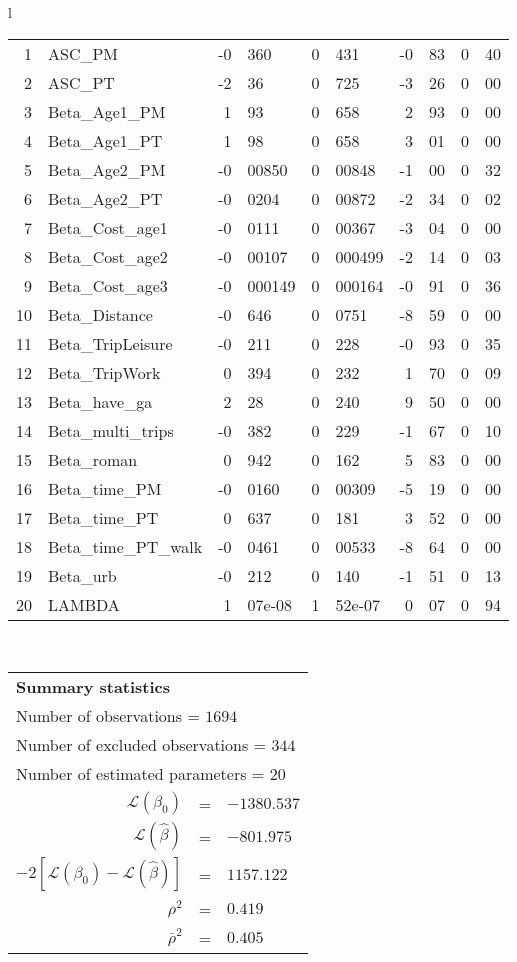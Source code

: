 \begin{tabular}{l}
\begin{tabular}{rlr@{.}lr@{.}lr@{.}lr@{.}l}
1 & ASC_PM  & -0&360 & 0&431 & -0&83 & 0&40\\
2 & ASC_PT & -2&36 & 0&725 & -3&26 & 0&00\\
3 & Beta_Age1_PM & 1&93 & 0&658 & 2&93 & 0&00\\
4 & Beta_Age1_PT & 1&98 & 0&658 & 3&01 & 0&00\\
5 & Beta_Age2_PM & -0&00850 & 0&00848 & -1&00 & 0&32\\
6 & Beta_Age2_PT & -0&0204 & 0&00872 & -2&34 & 0&02\\
7 & Beta_Cost_age1 & -0&0111 & 0&00367 & -3&04 & 0&00\\
8 & Beta_Cost_age2 & -0&00107 & 0&000499 & -2&14 & 0&03\\
9 & Beta_Cost_age3 & -0&000149 & 0&000164 & -0&91 & 0&36\\
10 & Beta_Distance & -0&646 & 0&0751 & -8&59 & 0&00\\
11 & Beta_TripLeisure & -0&211 & 0&228 & -0&93 & 0&35\\
12 & Beta_TripWork & 0&394 & 0&232 & 1&70 & 0&09\\
13 & Beta_have_ga & 2&28 & 0&240 & 9&50 & 0&00\\
14 & Beta_multi_trips & -0&382 & 0&229 & -1&67 & 0&10\\
15 & Beta_roman & 0&942 & 0&162 & 5&83 & 0&00\\
16 & Beta_time_PM & -0&0160 & 0&00309 & -5&19 & 0&00\\
17 & Beta_time_PT & 0&637 & 0&181 & 3&52 & 0&00\\
18 & Beta_time_PT_walk & -0&0461 & 0&00533 & -8&64 & 0&00\\
19 & Beta_urb & -0&212 & 0&140 & -1&51 & 0&13\\
20 & LAMBDA & 1&07e-08 & 1&52e-07 & 0&07 & 0&94\\
\hline
\end{tabular}
\\
\begin{tabular}{rcl}
\multicolumn{3}{l}{\bf Summary statistics}\\
\multicolumn{3}{l}{ Number of observations = $1694$} \\
\multicolumn{3}{l}{ Number of excluded observations = $344$} \\
\multicolumn{3}{l}{ Number of estimated  parameters = $20$} \\
 $\mathcal{L}(\beta_0)$ &=&  $-1380.537$ \\
 $\mathcal{L}(\hat{\beta})$ &=& $-801.975 $  \\
 $-2[\mathcal{L}(\beta_0) -\mathcal{L}(\hat{\beta})]$ &=& $1157.122$ \\
    $\rho^2$ &=&   $0.419$ \\
    $\bar{\rho}^2$ &=&    $0.405$ \\
\end{tabular}
  \end{tabular}
